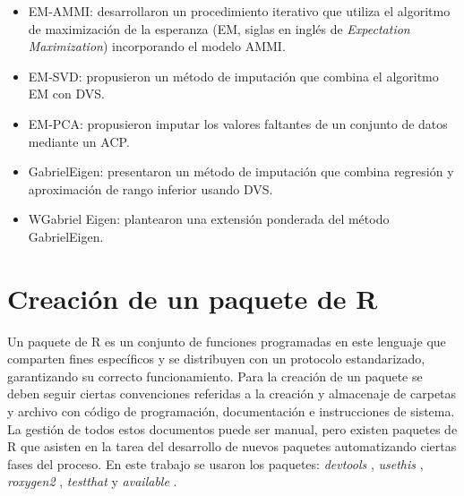 \begin{itemize}
\item EM-AMMI: \citet{GauchZobel1990} desarrollaron un procedimiento iterativo que utiliza el algoritmo de maximización de la esperanza (EM, siglas en inglés de \emph{Expectation Maximization}) incorporando el modelo AMMI. 
\end{itemize}
\begin{itemize}
\item EM-SVD: \citet{Troyanskayaetal2001} propusieron un método de imputación que combina el algoritmo EM con DVS. 
\end{itemize}
\begin{itemize}
\item EM-PCA: \citet{JosseHusson2016} propusieron imputar los valores faltantes de un conjunto de datos mediante un ACP.
\end{itemize}
\begin{itemize}
\item GabrielEigen: \citet{Alarconetal2010} presentaron un método de imputación que combina regresión y aproximación de rango inferior usando DVS. 
\end{itemize}
\begin{itemize}
\item WGabriel Eigen: \citet{Alarconetal2014} plantearon una extensión ponderada del método GabrielEigen.
\end{itemize}


\section{Creación de un paquete de R}


Un paquete de R es un conjunto de funciones programadas en este lenguaje que comparten fines específicos y se distribuyen con un protocolo estandarizado, garantizando su correcto funcionamiento. Para la creación de un paquete se deben seguir ciertas convenciones referidas a la creación y almacenaje de carpetas y archivo con código de programación, documentación e instrucciones de sistema. La gestión de todos estos documentos puede ser manual, pero existen paquetes de R que asisten en la tarea del desarrollo de nuevos paquetes automatizando ciertas fases del proceso. En este trabajo se usaron los paquetes: \emph{devtools} \citep{Wickhametal2021}, \emph{usethis} \citep{WickhamBryan2021}, \emph{roxygen2} \citep{Wickhametal2020}, \emph{testthat} \citep{Wickham2011} y \emph{available} \citep{Ganzetal2019}. 

